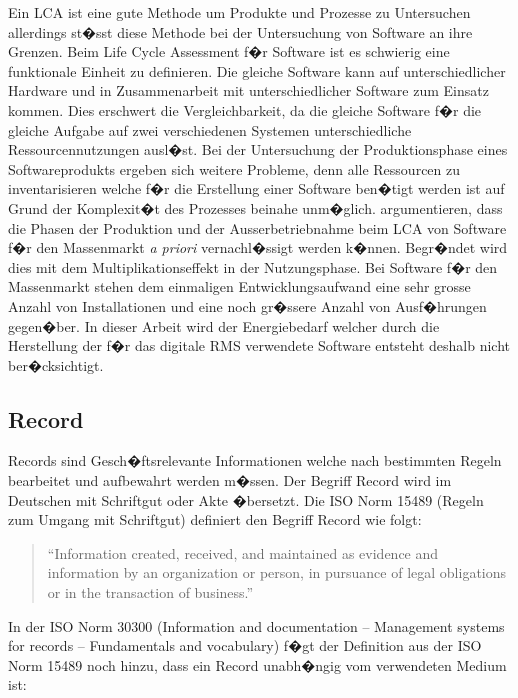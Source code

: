 \documentclass[a4paper,twoside,10pt]{report}
\begin{document}
Ein \ac{LCA} ist eine gute Methode um Produkte und Prozesse zu Untersuchen allerdings st�sst diese Methode bei der Untersuchung von Software an ihre Grenzen. Beim Life Cycle Assessment f�r Software ist es schwierig eine funktionale Einheit zu definieren. Die gleiche Software kann auf unterschiedlicher Hardware und in Zusammenarbeit mit unterschiedlicher Software zum Einsatz kommen. Dies erschwert die Vergleichbarkeit, da die gleiche Software f�r die gleiche Aufgabe auf zwei verschiedenen Systemen unterschiedliche Ressourcennutzungen ausl�st. Bei der Untersuchung der Produktionsphase eines Softwareprodukts ergeben sich weitere Probleme, denn alle Ressourcen zu inventarisieren welche f�r die Erstellung einer Software ben�tigt werden ist auf Grund der Komplexit�t des Prozesses beinahe unm�glich. \citeauthor{gsoft} argumentieren, dass die Phasen der Produktion und der Ausserbetriebnahme beim \ac{LCA} von Software f�r den Massenmarkt \emph{a priori} vernachl�ssigt werden k�nnen. Begr�ndet wird dies mit dem Multiplikationseffekt in der Nutzungsphase. Bei Software f�r den Massenmarkt stehen dem einmaligen Entwicklungsaufwand eine sehr grosse Anzahl von Installationen und eine noch gr�ssere Anzahl von Ausf�hrungen gegen�ber. In dieser Arbeit wird der Energiebedarf welcher durch die Herstellung der f�r das digitale \ac{RMS} verwendete Software entsteht deshalb nicht ber�cksichtigt. \cite{gsoft}


\subsection{Record}\label{subsec:defrec}
Records sind Gesch�ftsrelevante Informationen welche nach bestimmten Regeln bearbeitet und aufbewahrt werden m�ssen. Der Begriff Record wird im Deutschen mit Schriftgut oder Akte �bersetzt. Die ISO Norm 15489 (Regeln zum Umgang mit Schriftgut) definiert den Begriff Record wie folgt: 

\begin{quotation}
	"`Information created, received, and maintained as evidence and information by an 
	organization or person, in pursuance of legal obligations or in the transaction of 
	business."'\cite{ISO15489}
\end{quotation}

In der ISO Norm 30300 (Information and documentation -- Management systems for records -- Fundamentals and vocabulary) f�gt der Definition aus der ISO Norm 15489 noch hinzu, dass ein Record unabh�ngig vom verwendeten Medium ist:
\end{document}
